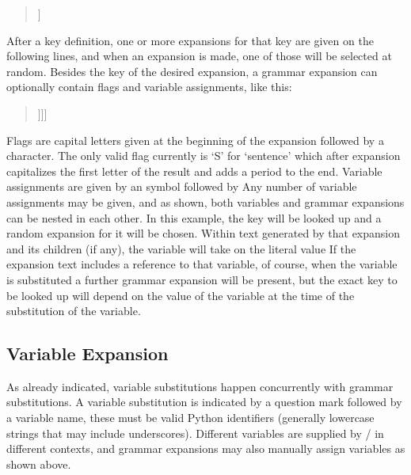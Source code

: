 \begin{quote}
  \ttfamily
  [[action/attack/option]]
\end{quote}

After a key definition, one or more expansions for that key are given on the following lines, and when an expansion is made, one of those will be selected at random.
%
Besides the key of the desired expansion, a grammar expansion can optionally contain flags and variable assignments, like this:

\begin{quote}
  \ttfamily
  [[S|misc/you\_ask\_for@statement=[[action/?\_action/option]]]]
\end{quote}

Flags are capital letters given at the beginning of the expansion followed by a \exchar{|} character.
%
The only valid flag currently is `S' for `sentence' which after expansion capitalizes the first letter of the result and adds a period to the end.
%
Variable assignments are given by an  symbol followed by 
%
Any number of variable assignments may be given, and as shown, both variables
and grammar expansions can be nested in each other.
%
In this example, the key  will be looked up and a random expansion for it will be chosen.
%
Within text generated by that expansion and its children (if any), the variable  will take on the literal value 
%
If the expansion text includes a reference to that variable, of course, when the variable is substituted a further grammar expansion will be present, but the exact key to be looked up will depend on the value of the variable  at the time of the substitution of the  variable.


\subsection{Variable Expansion}

As already indicated, variable substitutions happen concurrently with grammar substitutions.
%
A variable substitution is indicated by a question mark followed by a variable name, these must be valid Python identifiers (generally lowercase strings that may include underscores).
%
Different variables are supplied by \dunyazad/ in different contexts, and grammar expansions may also manually assign variables as shown above.


